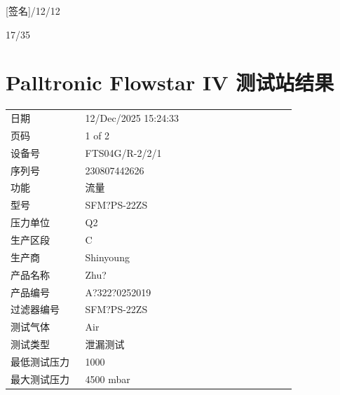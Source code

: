 \documentclass[UTF8,10pt,a4paper,fontset=fandol]{ctexart}
\newcommand{\fieldvalue}[1]{#1}
\newcommand{\handwritten}[1]{#1}
\begin{document}
\fieldvalue{\handwritten{[签名]/12/12}}

\fieldvalue{\handwritten{17/35}}

\newpage

\section{Palltronic Flowstar IV 测试站结果}

\begin{tabular}{@{}p{0.24\linewidth}p{0.68\linewidth}@{}}
日期 &
\fieldvalue{12/Dec/2025 15:24:33}
\\
页码 &
\fieldvalue{1 of 2}
\\
设备号 &
\fieldvalue{FTS04G/R-2/2/1}
\\
序列号 &
\fieldvalue{230807442626}
\\
功能 &
\fieldvalue{流量}
\\
型号 &
\fieldvalue{SFM?PS-22ZS}
\\
压力单位 &
\fieldvalue{Q2}
\\
生产区段 &
\fieldvalue{C}
\\
生产商 &
\fieldvalue{Shinyoung}
\\
产品名称 &
\fieldvalue{Zhu?}
\\
产品编号 &
\fieldvalue{A?322?0252019}
\\
过滤器编号 &
\fieldvalue{SFM?PS-22ZS}
\\
测试气体 &
\fieldvalue{Air}
\\
测试类型 &
\fieldvalue{泄漏测试}
\\
最低测试压力 &
\fieldvalue{1000}
\\
最大测试压力 &
\fieldvalue{4500 mbar}
\end{tabular}
\end{document}
